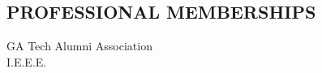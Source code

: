 \documentclass{res}
\begin{document}
\begin{resume}
\section{PROFESSIONAL MEMBERSHIPS}
	GA Tech Alumni Association\\
	I.E.E.E.


\end{resume}
\end{document}
